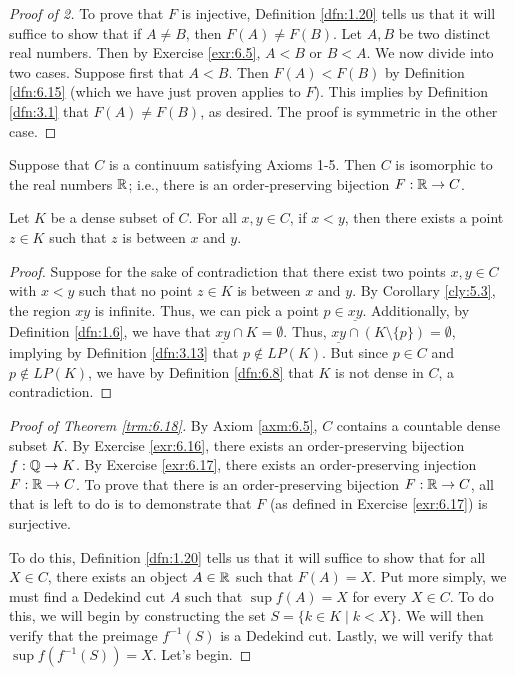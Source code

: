 \documentclass[../main.tex]{subfiles}
\begin{document}
\begin{exercise}
\begin{proof}[Proof of 2]
        To prove that $F$ is injective, Definition \ref{dfn:1.20} tells us that it will suffice to show that if $A\neq B$, then $F(A)\neq F(B)$. Let $A,B$ be two distinct real numbers. Then by Exercise \ref{exr:6.5}, $A<B$ or $B<A$. We now divide into two cases. Suppose first that $A<B$. Then $F(A)<F(B)$ by Definition \ref{dfn:6.15} (which we have just proven applies to $F$). This implies by Definition \ref{dfn:3.1} that $F(A)\neq F(B)$, as desired. The proof is symmetric in the other case.
    \end{proof}
\end{exercise}

\begin{theorem}\label{trm:6.18}
    Suppose that $C$ is a continuum satisfying Axioms 1-5. Then $C$ is isomorphic to the real numbers $\mathbb{R}$; i.e., there is an order-preserving bijection $F:\mathbb{R}\to C$.
    \begin{lemma*}
        Let $K$ be a dense subset of $C$. For all $x,y\in C$, if $x<y$, then there exists a point $z\in K$ such that $z$ is between $x$ and $y$.
        \begin{proof}
            Suppose for the sake of contradiction that there exist two points $x,y\in C$ with $x<y$ such that no point $z\in K$ is between $x$ and $y$. By Corollary \ref{cly:5.3}, the region $\underline{xy}$ is infinite. Thus, we can pick a point $p\in\underline{xy}$. Additionally, by Definition \ref{dfn:1.6}, we have that $\underline{xy}\cap K=\emptyset$. Thus, $\underline{xy}\cap(K\setminus\{p\})=\emptyset$, implying by Definition \ref{dfn:3.13} that $p\notin LP(K)$. But since $p\in C$ and $p\notin LP(K)$, we have by Definition \ref{dfn:6.8} that $K$ is not dense in $C$, a contradiction.
        \end{proof}
    \end{lemma*}
    \begin{proof}[Proof of Theorem \ref{trm:6.18}]
        By Axiom \ref{axm:6.5}, $C$ contains a countable dense subset $K$. By Exercise \ref{exr:6.16}, there exists an order-preserving bijection $f:\mathbb{Q}\to K$. By Exercise \ref{exr:6.17}, there exists an order-preserving injection $F:\mathbb{R}\to C$. To prove that there is an order-preserving bijection $F:\mathbb{R}\to C$, all that is left to do is to demonstrate that $F$ (as defined in Exercise \ref{exr:6.17}) is surjective.\par\smallskip
        To do this, Definition \ref{dfn:1.20} tells us that it will suffice to show that for all $X\in C$, there exists an object $A\in\mathbb{R}$ such that $F(A)=X$. Put more simply, we must find a Dedekind cut $A$ such that $\sup f(A)=X$ for every $X\in C$. To do this, we will begin by constructing the set $S=\{k\in K\mid k<X\}$. We will then verify that the preimage $f^{-1}(S)$ is a Dedekind cut. Lastly, we will verify that $\sup f(f^{-1}(S))=X$. Let's begin.\par\smallskip

\end{proof}
\end{theorem}
\end{document}
